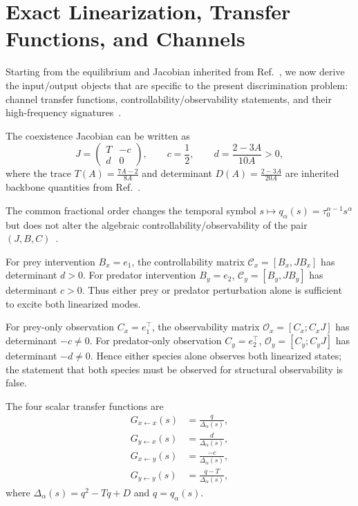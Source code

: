 \section{Exact Linearization, Transfer Functions, and Channels}
\label{sec:linearization}

Starting from the equilibrium and Jacobian inherited from Ref.~\cite{P01}, we now derive the input/output objects that are specific to the present discrimination problem: channel transfer functions, controllability/observability statements, and their high-frequency signatures~\cite{F05,F06,F07}.

The coexistence Jacobian can be written as
\begin{equation}
J = \begin{pmatrix} T & -c \\ d & 0 \end{pmatrix},
\qquad c = \frac{1}{2},
\qquad d = \frac{2-3A}{10A} > 0,
\label{eq:jacform}
\end{equation}
where the trace \(T(A) = \frac{7A-2}{8A}\) and determinant \(D(A) = \frac{2-3A}{20A}\) are inherited backbone quantities from Ref.~\cite{P01}.

The common fractional order changes the temporal symbol \(s \mapsto q_\alpha(s) = \tau_0^{\alpha-1} s^\alpha\) but does not alter the algebraic controllability/observability of the pair $(J,B,C)$~\cite{I05}.

For prey intervention \(B_x = e_1\), the controllability matrix \(\mathcal{C}_x = [B_x, J B_x]\) has determinant \(d>0\).
For predator intervention \(B_y = e_2\), \(\mathcal{C}_y = [B_y, J B_y]\) has determinant \(c>0\).
Thus either prey or predator perturbation alone is sufficient to excite both linearized modes.

For prey-only observation \(C_x = e_1^\top\), the observability matrix \(\mathcal{O}_x = [C_x; C_x J]\) has determinant \(-c \neq 0\).
For predator-only observation \(C_y = e_2^\top\), \(\mathcal{O}_y = [C_y; C_y J]\) has determinant \(-d \neq 0\).
Hence either species alone observes both linearized states; the statement that both species must be observed for structural observability is false.

The four scalar transfer functions are
\begin{align}
G_{x\leftarrow x}(s) &= \frac{q}{\Delta_\alpha(s)}, \\
G_{y\leftarrow x}(s) &= \frac{d}{\Delta_\alpha(s)}, \\
G_{x\leftarrow y}(s) &= \frac{-c}{\Delta_\alpha(s)}, \\
G_{y\leftarrow y}(s) &= \frac{q - T}{\Delta_\alpha(s)},
\end{align}
where \(\Delta_\alpha(s) = q^2 - T q + D\) and \(q = q_\alpha(s)\).

